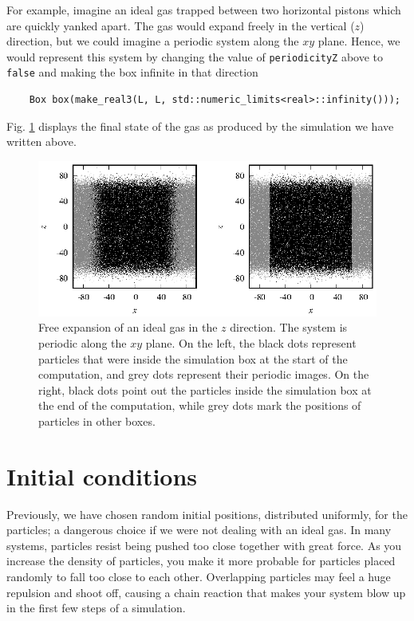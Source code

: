 For example, imagine an ideal gas trapped between two horizontal pistons which
are quickly yanked apart. The gas would expand freely in the vertical ($z$)
direction, but we could imagine a periodic system along the $xy$ plane. Hence,
we would represent this system by changing the value of \texttt{periodicityZ}
above to \texttt{false} and making the box infinite in that direction
\begin{lstlisting}
    Box box(make_real3(L, L, std::numeric_limits<real>::infinity()));
\end{lstlisting}
Fig. \ref{free_expansion} displays the final state of
the gas as produced by the simulation we have written above.

\begin{figure}
  \includegraphics[width = \textwidth]{figures/free_expansion.eps}
  \caption{\label{free_expansion}Free expansion of an ideal gas in the $z$
           direction. The system is periodic along the $xy$ plane. On the left,
           the black dots represent particles that were inside the simulation
           box at the start of the computation, and grey dots represent their
           periodic images. On the right, black dots point out the particles
           inside the simulation box at the end of the computation, while grey
           dots mark the positions of particles in other boxes.}
\end{figure}

\section{Initial conditions}

Previously, we have chosen random initial positions, distributed uniformly, for 
the particles; a dangerous choice if we were not dealing with an ideal gas. In 
many systems, particles resist being pushed too close together with great force. 
As you increase the density of particles, you make it more probable for 
particles placed randomly to fall too close to each other. Overlapping particles 
may feel a huge repulsion and shoot off, causing a chain reaction that makes 
your system blow up in the first few steps of a simulation.

